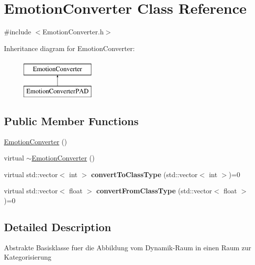 \hypertarget{class_emotion_converter}{
\section{\-Emotion\-Converter \-Class \-Reference}
\label{class_emotion_converter}
}


{\ttfamily \#include $<$\-Emotion\-Converter.\-h$>$}

\-Inheritance diagram for \-Emotion\-Converter\-:\begin{figure}[H]
\begin{center}
\leavevmode
\includegraphics[height=2.000000cm]{class_emotion_converter}
\end{center}
\end{figure}
\subsection*{\-Public \-Member \-Functions}
\begin{DoxyCompactItemize}
\item 
\hyperlink{class_emotion_converter_a1a7ad7327f039f8046a7fb7f3d1f7c32}{\-Emotion\-Converter} ()
\item 
virtual \hyperlink{class_emotion_converter_ae17726b58adada29053be51ebcefd503}{$\sim$\-Emotion\-Converter} ()
\item 
\hypertarget{class_emotion_converter_a866ee18fd748c732937ed520feb1078f}{
virtual std\-::vector$<$ int $>$ {\bfseries convert\-To\-Class\-Type} (std\-::vector$<$ int $>$)=0}
\label{class_emotion_converter_a866ee18fd748c732937ed520feb1078f}

\item 
\hypertarget{class_emotion_converter_a642ea765ffebc21f73b050c18e9b17e8}{
virtual std\-::vector$<$ float $>$ {\bfseries convert\-From\-Class\-Type} (std\-::vector$<$ float $>$)=0}
\label{class_emotion_converter_a642ea765ffebc21f73b050c18e9b17e8}

\end{DoxyCompactItemize}


\subsection{\-Detailed \-Description}
\-Abstrakte \-Basisklasse fuer die \-Abbildung vom \-Dynamik-\/\-Raum in einen \-Raum zur \-Kategorisierung 

